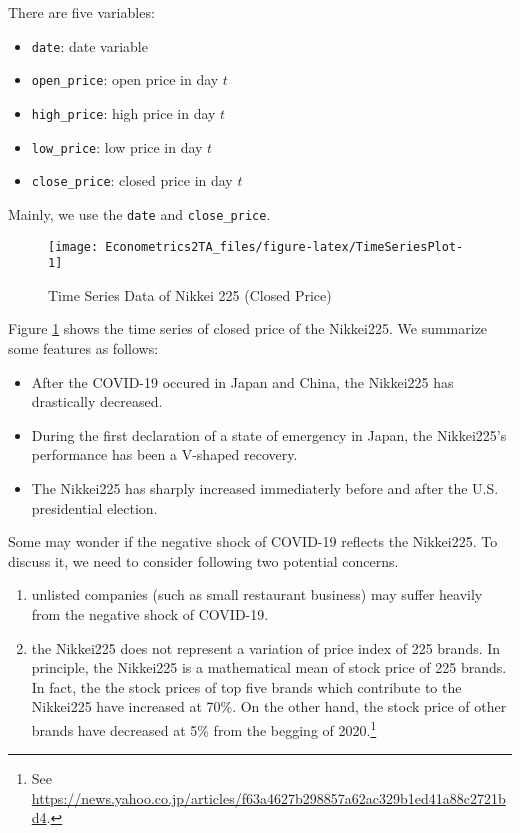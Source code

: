 \documentclass[
  12pt,
]{article}
\providecommand{\tightlist}{%
  \setlength{\itemsep}{0pt}\setlength{\parskip}{0pt}}
\begin{document}
There are five variables:

\begin{itemize}
\tightlist
\item
  \texttt{date}: date variable
\item
  \texttt{open\_price}: open price in day \(t\)
\item
  \texttt{high\_price}: high price in day \(t\)
\item
  \texttt{low\_price}: low price in day \(t\)
\item
  \texttt{close\_price}: closed price in day \(t\)
\end{itemize}

Mainly, we use the \texttt{date} and \texttt{close\_price}.

\begin{figure}[h]

{\centering \texttt{[image: Econometrics2TA\_files/figure-latex/TimeSeriesPlot-1]} 

}

\caption{Time Series Data of Nikkei 225 (Closed Price)}\label{fig:TimeSeriesPlot}
\end{figure}

Figure \ref{fig:TimeSeriesPlot} shows the time series of closed price of the Nikkei225.
We summarize some features as follows:

\begin{itemize}
\tightlist
\item
  After the COVID-19 occured in Japan and China, the Nikkei225 has drastically decreased.
\item
  During the first declaration of a state of emergency in Japan, the Nikkei225's performance has been a V-shaped recovery.
\item
  The Nikkei225 has sharply increased immediaterly before and after the U.S. presidential election.
\end{itemize}

Some may wonder if the negative shock of COVID-19 reflects the Nikkei225.
To discuss it, we need to consider following two potential concerns.

\begin{enumerate}
\def\labelenumi{\arabic{enumi}.}
\tightlist
\item
  unlisted companies (such as small restaurant business) may suffer heavily from the negative shock of COVID-19.
\item
  the Nikkei225 does not represent a variation of price index of 225 brands. In principle, the Nikkei225 is a mathematical mean of stock price of 225 brands. In fact, the the stock prices of top five brands which contribute to the Nikkei225 have increased at 70\%. On the other hand, the stock price of other brands have decreased at 5\% from the begging of 2020.\footnote{See \url{https://news.yahoo.co.jp/articles/f63a4627b298857a62ac329b1ed41a88c2721bd4}.}
\end{enumerate}
\end{document}
